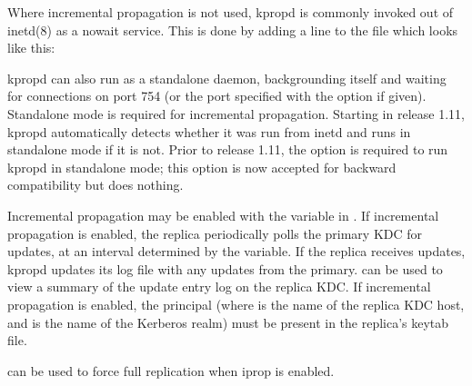 \documentclass[letterpaper,10pt,english]{sphinxmanual}
\begin{document}
\sphinxAtStartPar
Where incremental propagation is not used, kpropd is commonly invoked
out of inetd(8) as a nowait service.  This is done by adding a line to
the  file which looks like this:

\begin{sphinxVerbatim}[commandchars=\\\{\}]
            
\end{sphinxVerbatim}

\sphinxAtStartPar
kpropd can also run as a standalone daemon, backgrounding itself and
waiting for connections on port 754 (or the port specified with the
 option if given).  Standalone mode is required for incremental
propagation.  Starting in release 1.11, kpropd automatically detects
whether it was run from inetd and runs in standalone mode if it is
not.  Prior to release 1.11, the  option is required to run
kpropd in standalone mode; this option is now accepted for backward
compatibility but does nothing.

\sphinxAtStartPar
Incremental propagation may be enabled with the 
variable in {\hyperref[\detokenize{admin/conf_files/kdc_conf:kdc-conf-5}]{}}.  If incremental propagation is
enabled, the replica periodically polls the primary KDC for updates, at
an interval determined by the  variable.  If the
replica receives updates, kpropd updates its log file with any updates
from the primary.  {\hyperref[\detokenize{admin/admin_commands/kproplog:kproplog-8}]{}} can be used to view a summary of
the update entry log on the replica KDC.  If incremental propagation
is enabled, the principal  (where
 is the name of the replica KDC host, and  is
the name of the Kerberos realm) must be present in the replica’s
keytab file.

\sphinxAtStartPar
{\hyperref[\detokenize{admin/admin_commands/kproplog:kproplog-8}]{}} can be used to force full replication when iprop is
enabled.
\end{document}
